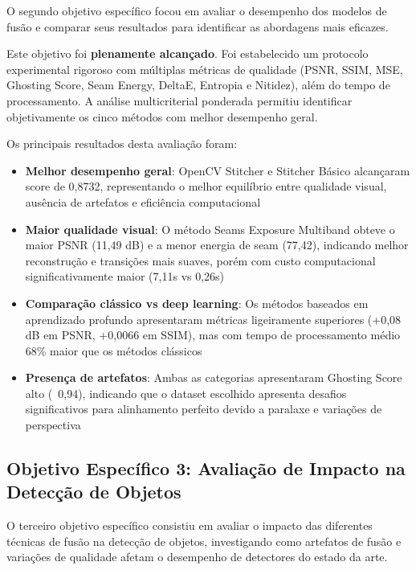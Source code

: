 O segundo objetivo específico focou em avaliar o desempenho dos modelos de fusão e comparar seus resultados para identificar as abordagens mais eficazes.

Este objetivo foi \textbf{plenamente alcançado}. Foi estabelecido um protocolo experimental rigoroso com múltiplas métricas de qualidade (PSNR, SSIM, MSE, Ghosting Score, Seam Energy, DeltaE, Entropia e Nitidez), além do tempo de processamento. A análise multicriterial ponderada permitiu identificar objetivamente os cinco métodos com melhor desempenho geral.

Os principais resultados desta avaliação foram:

\begin{itemize}
    \item \textbf{Melhor desempenho geral}: OpenCV Stitcher e Stitcher Básico alcançaram score de 0,8732, representando o melhor equilíbrio entre qualidade visual, ausência de artefatos e eficiência computacional

    \item \textbf{Maior qualidade visual}: O método Seams Exposure Multiband obteve o maior PSNR (11,49 dB) e a menor energia de seam (77,42), indicando melhor reconstrução e transições mais suaves, porém com custo computacional significativamente maior (7,11s vs 0,26s)

    \item \textbf{Comparação clássico vs deep learning}: Os métodos baseados em aprendizado profundo apresentaram métricas ligeiramente superiores (+0,08 dB em PSNR, +0,0066 em SSIM), mas com tempo de processamento médio 68\% maior que os métodos clássicos

    \item \textbf{Presença de artefatos}: Ambas as categorias apresentaram Ghosting Score alto (~0,94), indicando que o dataset escolhido apresenta desafios significativos para alinhamento perfeito devido a paralaxe e variações de perspectiva
\end{itemize}

\subsection{Objetivo Específico 3: Avaliação de Impacto na Detecção de Objetos}

O terceiro objetivo específico consistiu em avaliar o impacto das diferentes técnicas de fusão na detecção de objetos, investigando como artefatos de fusão e variações de qualidade afetam o desempenho de detectores do estado da arte.

